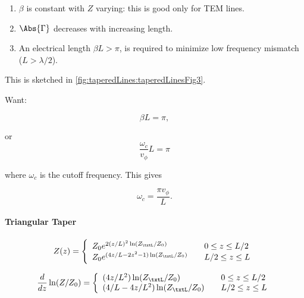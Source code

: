 \begin{enumerate}
\item \( \beta \) is constant with \( Z \) varying: this is good only for TEM lines.
\item \( \Abs{\Gamma} \) decreases with increasing length.
\item An electrical length \( \beta L > \pi \), is required to minimize low frequency mismatch (\( L > \lambda/2\)).
\end{enumerate}

This is sketched in \cref{fig:taperedLines:taperedLinesFig3}.


Want:

\begin{dmath}\label{eqn:continuumAndOtherTransformersCore:760}
\beta L = \pi,
\end{dmath}

or
\begin{dmath}\label{eqn:continuumAndOtherTransformersCore:780}
\frac{\omega_c}{v_\phi} L = \pi
\end{dmath}

where \( \omega_c \) is the cutoff frequency.  This gives

\begin{dmath}\label{eqn:continuumAndOtherTransformersCore:800}
\omega_c = \frac{\pi v_\phi}{L}.
\end{dmath}

\paragraph{Triangular Taper}

\begin{equation}\label{eqn:continuumAndOtherTransformersCore:960}
Z(z) =
\left\{
\begin{array}{l l}
Z_0 e^{2(z/L)^2 \ln(Z_\txtL/Z_0)} & \quad \mbox{\( 0 \le z \le L/2\)} \\
Z_0 e^{(4z/L - 2 z^2 - 1) \ln(Z_\txtL/Z_0)} & \quad \mbox{\( L/2 \le z \le L\)} \\
\end{array}
\right.
\end{equation}

\begin{equation}\label{eqn:continuumAndOtherTransformersCore:980}
\frac{d}{dz} \ln (Z/Z_0) =
\left\{
\begin{array}{l l}
{(4z/L^2) \ln(Z_\txtL/Z_0)} & \quad \mbox{\( 0 \le z \le L/2\)} \\
{(4/L - 4z/L^2) \ln(Z_\txtL/Z_0)} & \quad \mbox{\( L/2 \le z \le L\)} \\
\end{array}
\right.
\end{equation}

